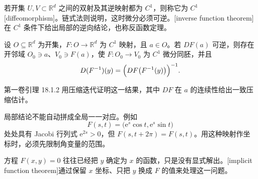 若开集 \(U,V\subset\mathbb R^d\) 之间的双射及其逆映射都为 \(C^1\)，则称它为 \(C^1\) [diffeomorphism]。链式法则说明，这时微分必须可逆。[inverse function theorem]在 \(C^1\) 条件下给出局部的逆向结论，也称反函数定理。

\begin{theorem}[逆函数]\label{b2:thm:01-inverse}
设 \(O\subseteq\mathbb R^d\) 为开集，\(F:O\rightarrow\mathbb R^d\) 为 \(C^1\) 映射，且 \(a\in O\)。若 \(DF(a)\) 可逆，则存在开邻域 \(O_0\ni a\)、\(V_0\ni F(a)\)，使 \(F:O_0\rightarrow V_0\) 为 \(C^1\) 微分同胚，并且
\[
 D(F^{-1})(y)=\Bigl(DF\bigl(F^{-1}(y)\bigr)\Bigr)^{-1}.
\]
\end{theorem}

第一卷引理 18.1.2 用压缩迭代证明这一结果，其中 \(DF\) 在 \(a\) 的连续性给出一致压缩估计。

\ProseParagraphBreak

局部结论不能自动拼成全局一一对应。例如
\[
 F(s,t)=\bigl(\mathrm{e}^s\cos t,\mathrm{e}^s\sin t\bigr)
\]
处处具有 Jacobi 行列式 \(\mathrm{e}^{2s}>0\)，但 \(F(s,t+2\pi)=F(s,t)\)。用这种映射作坐标时，必须先限制角变量的范围。

\ProseParagraphBreak

方程 \(F(x,y)=0\) 往往已经把 \(y\) 确定为 \(x\) 的函数，只是没有显式解出。[implicit function theorem]通过保留 \(x\) 坐标、只把 \(y\) 换成 \(F\) 的值来处理这一问题。

